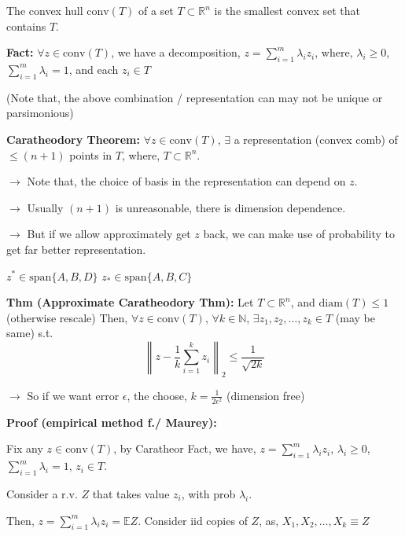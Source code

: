 \documentclass[12pt]{article}
\begin{document}
The convex hull $\text{conv}(T)$ of a set $T \subset \mathbb{R}^n$ is the smallest convex set that contains $T$.


\textbf{Fact:} $\forall z \in \text{conv}(T)$, we have a decomposition, $z = \sum_{i=1}^m \lambda_i z_i$, where, $\lambda_i \geq 0$,
$\sum_{i=1}^m \lambda_i = 1$, and each $z_i \in T$

(Note that, the above combination / representation can may not be unique or parsimonious)

\textbf{Caratheodory Theorem:} $\forall z \in \text{conv}(T)$, $\exists$ a representation (convex comb) of $\leq (n+1)$ points in $T$, where, $T \subset \mathbb{R}^n$.

$\rightarrow$ Note that, the choice of basis in the representation can depend on $z$.

$\rightarrow$ Usually $(n+1)$ is unreasonable, there is dimension dependence.

$\rightarrow$ But if we allow approximately get $z$ back, we can make use of probability to get far better representation.


$z^* \in \text{span}\{A,B,D\}$
$z_* \in \text{span}\{A,B,C\}$

\textbf{Thm (Approximate Caratheodory Thm):} Let $T \subset \mathbb{R}^n$, and $\text{diam}(T) \leq 1$ (otherwise rescale)
Then, $\forall z \in \text{conv}(T)$, $\forall k \in \mathbb{N}$, $\exists z_1, z_2, \ldots, z_k \in T$ (may be same)
s.t.
$$\left\|z - \frac{1}{k} \sum_{i=1}^k z_i\right\|_2 \leq \frac{1}{\sqrt{2k}}$$

$\rightarrow$ So if we want error $\epsilon$, the choose, $k = \frac{1}{2\epsilon^2}$ (dimension free)

\textbf{Proof (empirical method f./ Maurey):}

Fix any $z \in \text{conv}(T)$, by Caratheor Fact, we have,
$z = \sum_{i=1}^m \lambda_i z_i$, $\lambda_i \geq 0$, $\sum_{i=1}^m \lambda_i = 1$, $z_i \in T$.

Consider a r.v. $Z$ that takes value $z_i$, with prob $\lambda_i$.

Then, $z = \sum_{i=1}^m \lambda_i z_i = \mathbb{E}Z$. Consider iid copies of $Z$, as, $X_1, X_2, \ldots, X_k \equiv Z$
\end{document}
